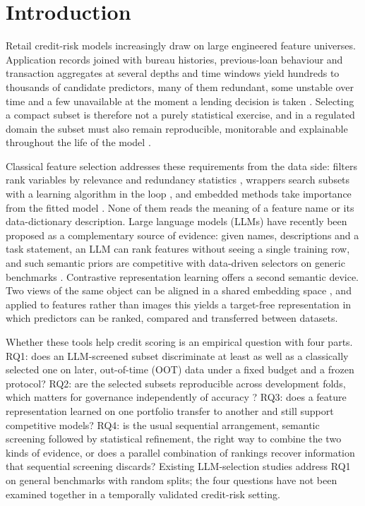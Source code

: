 \documentclass[final,5p,twocolumn]{elsarticle}
\begin{document}

\section{Introduction}
\label{sec:introduction}

Retail credit-risk models increasingly draw on large engineered feature universes. Application records joined with bureau histories, previous-loan behaviour and transaction aggregates at several depths and time windows yield hundreds to thousands of candidate predictors, many of them redundant, some unstable over time and a few unavailable at the moment a lending decision is taken \cite{thomas2002,siddiqi2006}. Selecting a compact subset is therefore not a purely statistical exercise, and in a regulated domain the subset must also remain reproducible, monitorable and explainable throughout the life of the model \cite{lessmann2015,gunnarsson2021,ballegeer2025}.

Classical feature selection addresses these requirements from the data side: filters rank variables by relevance and redundancy statistics \cite{guyon2003,peng2005}, wrappers search subsets with a learning algorithm in the loop \cite{kohavi1997,guyon2002,kursa2010}, and embedded methods take importance from the fitted model \cite{tibshirani1996,lundberg2017}. None of them reads the meaning of a feature name or its data-dictionary description. Large language models (LLMs) have recently been proposed as a complementary source of evidence: given names, descriptions and a task statement, an LLM can rank features without seeing a single training row, and such semantic priors are competitive with data-driven selectors on generic benchmarks \cite{choi2022,jeong2025,li2025sigkdd,zhang2025llmlasso}. Contrastive representation learning offers a second semantic device. Two views of the same object can be aligned in a shared embedding space \cite{radford2021,oord2018}, and applied to features rather than images this yields a target-free representation in which predictors can be ranked, compared and transferred between datasets.

Whether these tools help credit scoring is an empirical question with four parts. RQ1: does an LLM-screened subset discriminate at least as well as a classically selected one on later, out-of-time (OOT) data under a fixed budget and a frozen protocol? RQ2: are the selected subsets reproducible across development folds, which matters for governance independently of accuracy \cite{kalousis2007,nogueira2018}? RQ3: does a feature representation learned on one portfolio transfer to another and still support competitive models? RQ4: is the usual sequential arrangement, semantic screening followed by statistical refinement, the right way to combine the two kinds of evidence, or does a parallel combination of rankings recover information that sequential screening discards? Existing LLM-selection studies address RQ1 on general benchmarks with random splits; the four questions have not been examined together in a temporally validated credit-risk setting.
\end{document}
